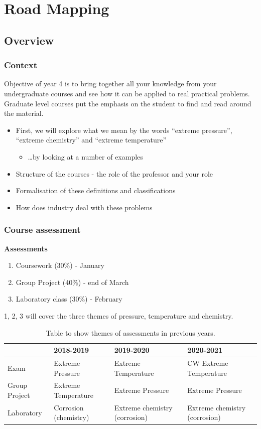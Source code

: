 \chapter{Road Mapping}
\section{Overview}
\subsection{Context}
Objective of year 4 is to bring together all your knowledge from your undergraduate courses and see how it can be applied to real practical problems. Graduate level courses put the emphasis on the student to find and read around the material.
\begin{itemize}
    \item First, we will explore what we mean by the words ``extreme pressure'', ``extreme chemistry'' and ``extreme temperature''
          \begin{itemize}
              \item \dots by looking at a number of examples
          \end{itemize}
    \item Structure of the courses - the role of the professor and your role
    \item Formalisation of these definitions and classifications
    \item How does industry deal with these problems
\end{itemize}
\subsection{Course assessment}
\textbf{Assessments}
\begin{enumerate}
    \item Coursework (30\%) - January
    \item Group Project (40\%) - end of March
    \item Laboratory class (30\%) - February
\end{enumerate}
1, 2, 3 will cover the three themes of pressure, temperature and chemistry.
\begin{table}[htbp]
    \centering
    \begin{tabular}{@{}llll@{}}
        \toprule
                      & \textbf{2018-2019}    & \textbf{2019-2020}            & \textbf{2020-2021}            \\
        \midrule
        Exam          & Extreme Pressure      & Extreme Temperature           & CW Extreme Temperature        \\
        Group Project & Extreme Temperature   & Extreme Pressure              & Extreme Pressure              \\
        Laboratory    & Corrosion (chemistry) & Extreme chemistry (corrosion) & Extreme chemistry (corrosion) \\
        \bottomrule
    \end{tabular}
    \caption{Table to show themes of assessments in previous years.}
\end{table}
